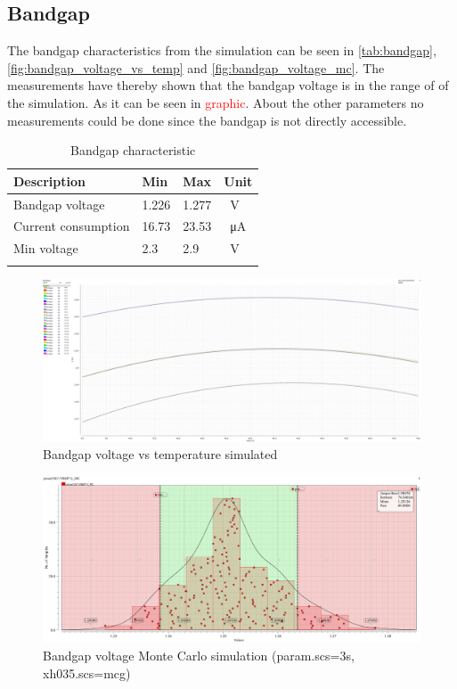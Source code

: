 \subsection{Bandgap}
The bandgap characteristics from the simulation can be seen in \autoref{tab:bandgap}, \autoref{fig:bandgap_voltage_vs_temp} and \autoref{fig:bandgap_voltage_mc}. The measurements have thereby shown that the bandgap voltage is in the range of of the simulation. As it can be seen in \textcolor{red}{graphic}. About the other parameters no measurements could be done since the bandgap is not directly accessible.
\begin{longtable}{|p{3.5cm}|p{3.5cm}|p{3.5cm}|p{3.5cm}|}
	\hline
	\rowcolor{lightgray}
	\textbf{Description} &\textbf{Min} &\textbf{Max} & \textbf{Unit} \\ \hline
	
	Bandgap voltage & 1.226 & 1.277 &\qty{}{\volt} \\ \hline
	Current consumption & 16.73 & 23.53 & \qty{}{\micro\ampere} \\ \hline
	Min voltage & 2.3& 2.9 & \qty{}{\volt} \\ \hline
	\caption{Bandgap characteristic} %
	\label{tab:bandgap}
\end{longtable}
\begin{figure}[ht]
	\centering
	\includegraphics[width=\textwidth]{images/05_bandgap/band_volt.pdf}
	\caption{Bandgap voltage vs temperature simulated}
	\label{fig:bandgap_voltage_vs_temp}
\end{figure}
\begin{figure}[ht]
	\centering
	\includegraphics[width=\textwidth]{images/05_bandgap/band_volt_mc.pdf}
	\caption{Bandgap voltage Monte Carlo simulation (param.scs=3s, xh035.scs=mcg)}
	\label{fig:bandgap_voltage_mc}
\end{figure}
\clearpage

